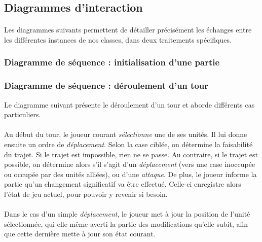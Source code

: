 \documentclass[a4paper]{article}
\begin{document}


\subsection{Diagrammes d'interaction}
\paragraph{}
Les diagrammes suivants permettent de détailler précisément les échanges entre les différentes instances de nos classes, dans deux traitements spécifiques.

\subsubsection{Diagramme de séquence : initialisation d'une partie}



\subsubsection{Diagramme de séquence : déroulement d'un tour}

Le diagramme suivant présente le déroulement d'un tour et aborde différents cas particuliers.

\paragraph{}
Au début du tour, le joueur courant \textit{sélectionne} une de ses unités. Il lui donne ensuite un ordre de \textit{déplacement}. Selon la case ciblée, on détermine la faisabilité du trajet. Si le trajet est impossible, rien ne se passe. Au contraire, si le trajet est possible, on détermine alors s'il s'agit d'un \textit{déplacement} (vers une case inoccupée ou occupée par des unités alliées), ou d'une \textit{attaque}. De plus, le joueur informe la partie qu'un changement significatif va être effectué. Celle-ci enregistre alors l'état de jeu actuel, pour pouvoir y revenir si besoin.

\paragraph{}
Dans le cas d'un simple \textit{déplacement}, le joueur met à jour la position de l'unité sélectionnée, qui elle-même averti la partie des modifications qu'elle subit, afin que cette dernière mette à jour son état courant.
\end{document}
